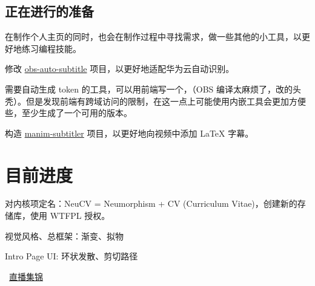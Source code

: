 \documentclass[UTF8]{ctexart}
\begin{document}
\subsection*{正在进行的准备}

    在制作个人主页的同时，也会在制作过程中寻找需求，做一些其他的小工具，以更好地练习编程技能。

    修改 \href{https://gitee.com/LogCreative/obs-auto-subtitle}{obs-auto-subtitle} 项目，以更好地适配华为云自动识别。

    需要自动生成 token 的工具，可以用前端写一个，（OBS 编译太麻烦了，改的头秃）。但是发现前端有跨域访问的限制，在这一点上可能使用内嵌工具会更加方便些，至少生成了一个可用的版本。

    \noindent{}

    构造 \href{https://github.com/LogCreative/manim-subtitler}{manim-subtitler} 项目，以更好地向视频中添加 \LaTeX{} 字幕。

\section{目前进度}

    对内核项定名：NeuCV = Neumorphism + CV (Curriculum Vitae)，创建新的存储库，使用 WTFPL 授权。

    视觉风格、总框架：渐变、拟物

    Intro Page UI: 环状发散、剪切路径

    \faYoutubePlay~\href{https://www.bilibili.com/video/BV1Lh411z7tZ/}{直播集锦}

\end{document}
